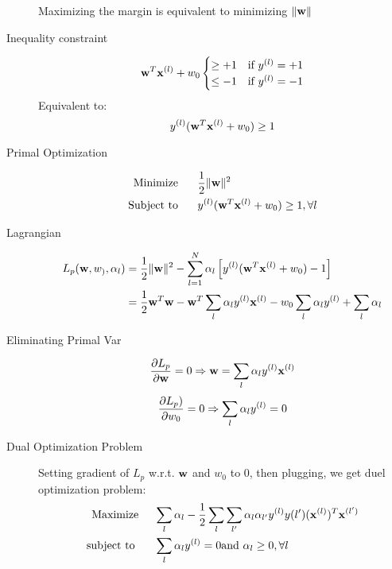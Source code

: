 \begin{description}
             Maximizing the margin is equivalent to minimizing $\|\mathbf{w}\|$
    \item[Inequality constraint] 
        \[
             \mathbf{w}^T\mathbf{x}^{(l)} + w_0 \begin{cases} \geq +1 & \mbox{if } y^{(l)} =
                 +1 \\ \leq -1 & \mbox{if } y^{(l)} = -1 \end{cases} \]
             Equivalent to:
             \[ y^{(l)}(\mathbf{w}^T\mathbf{x}^{(l)} + w_0) \geq 1 \]
     \item[Primal Optimization]  
         \begin{align*}
             \mbox{Minimize }& \hspace{0.5cm} \frac{1}{2}\|\mathbf{w}\|^2 \\
             \mbox{Subject to } & \hspace{0.5cm} y^{(l)}(\mathbf{w}^T\mathbf{x}^{(l)} +
             w_0) \geq 1 , \forall l
         \end{align*}
     \item[Lagrangian] \begin{align*} L_p(\mathbf{w}, w_), {\alpha_l}) & =
             \frac{1}{2}\|\mathbf{w}\|^2 - \sum_{l =1}^N \alpha_l\left[
                 y^{(l)}(\mathbf{w}^T\mathbf{x}^{(l)} + w_0) -1
                 \right] \\
                 & = \frac{1}{2}\mathbf{w}^T\mathbf{w} - \mathbf{w}^T\sum_l\alpha_l y^{(l)}\mathbf{x}^{(l)}
                 - w_0\sum_l \alpha_l y^{(l)} + \sum_l \alpha_l
             \end{align*}
         \item[Eliminating Primal Var]\[ \frac{\partial L_p }{\partial \mathbf{w}} = 0
             \Rightarrow \mathbf{w} = \sum_l \alpha_ly^{(l)}\mathbf{x}^{(l)}\]
             \[\frac{\partial L_p)}{\partial w_0} = 0 \Rightarrow \sum_l
             \alpha_ly^{(l)} = 0\]
         \item[Dual Optimization Problem] Setting gradient of $L_p$ w.r.t. $\mathbf{w}$
             and $w_0$ to 0, then plugging, we get duel optimization problem:
             \begin{align*}
                 \mbox{Maximize}&\hspace{0.5cm} \sum_l\alpha_l -
                 \frac{1}{2}\sum_l\sum_{l'}\alpha_l\alpha_{l'}y^{(l)}y{(l')}(\mathbf{x}^{(l)})^T\mathbf{x}^{(l')}
                 \\
                 \mbox{subject to }&\hspace{0.5cm} \sum_l \alpha_ly^{(l)} = 0
                 \mbox{and }\alpha_l \geq 0, \forall l
             \end{align*}

\end{description}
